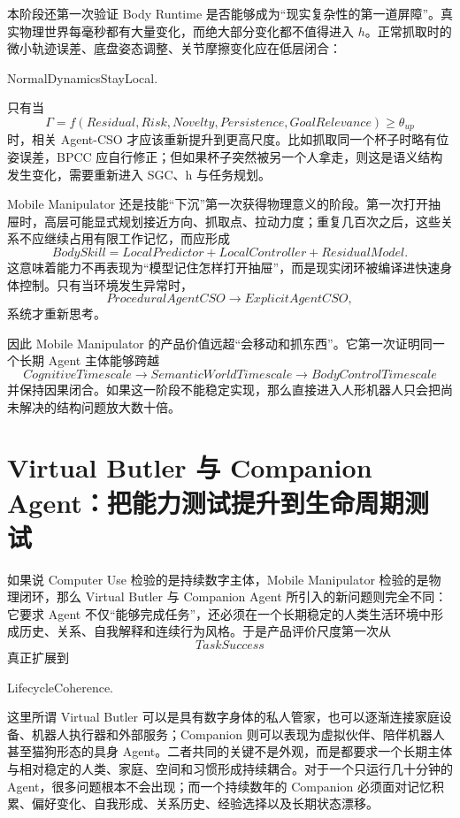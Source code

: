 本阶段还第一次验证 Body Runtime 是否能够成为“现实复杂性的第一道屏障”。真实物理世界每毫秒都有大量变化，而绝大部分变化都不值得进入 $h$。正常抓取时的微小轨迹误差、底盘姿态调整、关节摩擦变化应在低层闭合：
\begin{statementbox}
NormalDynamicsStayLocal.
\end{statementbox}
只有当
\[
\Gamma
=
f(
Residual,
Risk,
Novelty,
Persistence,
GoalRelevance
)
\geq
\theta_{up}
\]
时，相关 Agent-CSO 才应该重新提升到更高尺度。比如抓取同一个杯子时略有位姿误差，BPCC 应自行修正；但如果杯子突然被另一个人拿走，则这是语义结构发生变化，需要重新进入 SGC、h 与任务规划。

Mobile Manipulator 还是技能“下沉”第一次获得物理意义的阶段。第一次打开抽屉时，高层可能显式规划接近方向、抓取点、拉动力度；重复几百次之后，这些关系不应继续占用有限工作记忆，而应形成
\[
BodySkill
=
LocalPredictor
+
LocalController
+
ResidualModel.
\]
这意味着能力不再表现为“模型记住怎样打开抽屉”，而是现实闭环被编译进快速身体控制。只有当环境发生异常时，
\[
ProceduralAgentCSO
\rightarrow
ExplicitAgentCSO,
\]
系统才重新思考。

因此 Mobile Manipulator 的产品价值远超“会移动和抓东西”。它第一次证明同一个长期 Agent 主体能够跨越
\[
CognitiveTimescale
\rightarrow
SemanticWorldTimescale
\rightarrow
BodyControlTimescale
\]
并保持因果闭合。如果这一阶段不能稳定实现，那么直接进入人形机器人只会把尚未解决的结构问题放大数十倍。

\section{Virtual Butler 与 Companion Agent：把能力测试提升到生命周期测试}

如果说 Computer Use 检验的是持续数字主体，Mobile Manipulator 检验的是物理闭环，那么 Virtual Butler 与 Companion Agent 所引入的新问题则完全不同：它要求 Agent 不仅“能够完成任务”，还必须在一个长期稳定的人类生活环境中形成历史、关系、自我解释和连续行为风格。于是产品评价尺度第一次从
\[
TaskSuccess
\]
真正扩展到
\begin{statementbox}
LifecycleCoherence.
\end{statementbox}

这里所谓 Virtual Butler 可以是具有数字身体的私人管家，也可以逐渐连接家庭设备、机器人执行器和外部服务；Companion 则可以表现为虚拟伙伴、陪伴机器人甚至猫狗形态的具身 Agent。二者共同的关键不是外观，而是都要求一个长期主体与相对稳定的人类、家庭、空间和习惯形成持续耦合。对于一个只运行几十分钟的 Agent，很多问题根本不会出现；而一个持续数年的 Companion 必须面对记忆积累、偏好变化、自我形成、关系历史、经验选择以及长期状态漂移。


